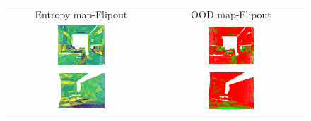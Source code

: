     \begin{figure}[h!]
        \centering
        \begin{tabular}{cc}
            Entropy map-Flipout & OOD map-Flipout \\
            \includegraphics[width=0.33\textwidth, height=0.18\textheight]{images/ood_imgs/fout_s3dis/ofc_3_fout_ent.pdf}& 
            \includegraphics[width=0.33\textwidth, height=0.18\textheight]{images/ood_imgs/fout_s3dis/fout_ent_2.pdf}\\

            \includegraphics[width=0.33\textwidth, height=0.18\textheight]{images/ood_imgs/fout_s3dis/cf1_fout_ent.pdf}& 
            \includegraphics[width=0.33\textwidth, height=0.18\textheight]{images/ood_imgs/fout_s3dis/fout_ent_4.pdf}\\


\end{tabular}
\end{figure}
